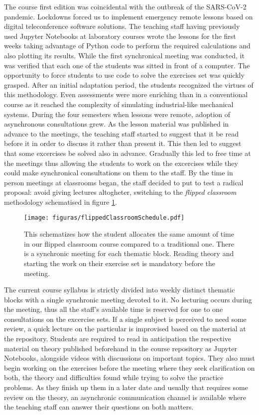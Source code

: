 The course first edition was coincidental with the outbreak of the SARS-CoV-2 pandemic.
Lockdowns forced us to implement emergency remote lessons based on digital teleconference software solutions.
The teaching staff having previously used Jupyter Notebooks at laboratory courses wrote the lessons for the first weeks taking advantage of Python code to perform the required calculations and also plotting its results.
While the first synchronical meeting was conducted, it was verified that each one of the students was sitted in front of a computer.
The opportunity to force students to use code to solve the exercises set was quickly grasped.
After an initial adaptation period, the students recognized the virtues of this methodology. 
Even assessments were more enriching than in a conventional course as it reached the complexity of simulating industrial-like mechanical systems.
During the four semesters when lessons were remote, adoption of asynchronous consultations grew.
As the lesson material was published in advance to the meetings, the teaching staff started to suggest that it be read before it in order to discuss it rather than present it.
This then led to suggest that some excercises be solved also in advance.
Gradually this led to free time at the meetings thus allowing the students to work on the excercises while they could make synchronical consultations on them to the staff.
By the time in person meetings at classrooms began, the staff decided to put to test a radical proposal: avoid giving lectures altogheter, switching to the \textit{flipped classroom} methodology \cite{oflaherty_use_2015, noauthor_flipped_2024} schematised in figure \ref{fig:flippedClassroomSchedule}.

\begin{figure}[ht]
\centering
\texttt{[image: figuras/flippedClassroomSchedule.pdf]}
\caption{This schematizes how the student allocates the same amount of time in our flipped classroom course compared to a traditional one. There is a synchronic meeting for each thematic block. Reading theory and starting the work on their exercise set is mandatory before the meeting.}
\label{fig:flippedClassroomSchedule}
\end{figure}

The current course syllabus is strictly divided into weekly distinct thematic blocks with a single synchronic meeting devoted to it.
No lecturing occurs during the meeting, thus all the staff's available time is reserved for one to one consultations on the excercise sets.
If a single subject is perceived to need some review, a quick lecture on the particular is improvised based on the material at the repository.
Students are required to read in anticipation the respective material on theory published beforehand in the course repository as Jupyter Notebooks, alongside videos with discussions on important topics.
They also must begin working on the exercises before the meeting where they seek clarification on both, the theory and difficulties found while trying to solve the practice problems. 
As they finish up them in a later date and usually that requires some review on the theory, an asynchronic communication channel is available where the teaching staff can answer their questions on both matters.
